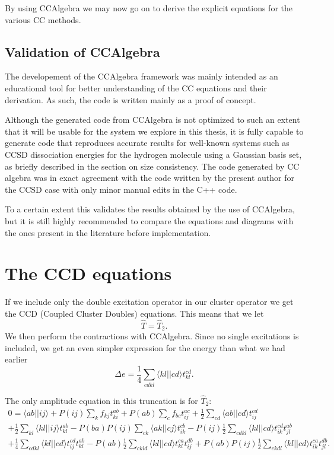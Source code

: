 By using CCAlgebra we may now go on to derive the explicit equations for the various CC methods. 

\subsection{Validation of CCAlgebra}

The developement of the CCAlgebra framework was mainly intended as an educational tool for better understanding of the CC equations and their derivation. As such, the code is written mainly as a proof of concept. 

Although the generated code from CCAlgebra is not optimized to such an
extent that it will be usable for the system we explore in this
thesis, it is fully capable to generate code that reproduces accurate
results for well-known systems such as CCSD dissociation energies for
the hydrogen molecule using a Gaussian basis set, as briefly described
in the section on size consistency. The code generated by CC algebra
was in exact agreement with the  code written by the present author for the CCSD case with
only minor manual edits in the C++ code.

To a certain extent this validates the results obtained by the use of
CCAlgebra, but it is still highly recommended to compare the equations
and diagrams with the ones present in the literature before
implementation.

\section{The CCD equations}

If we include only the double excitation operator in our cluster
operator we get the CCD (Coupled Cluster Doubles) equations. This
means that we let
\begin{equation}
\hat{T} = \hat{T}_2.
\end{equation}
We then perform the contractions with CCAlgebra. Since no single
excitations is included, we get an even simpler expression for the
energy than what we had earlier
\begin{equation}
\Delta e = \frac{1}{4} \sum_{cdkl} \langle kl || cd \rangle t_{kl}^{cd}.
\end{equation}

The only amplitude equation in this truncation is for $\hat{T}_2$:
\begin{multline}
0 =\langle ab \vert \vert ij \rangle + 
P(ij) \sum_{k} f_{kj} t_{ki}^{ab}+P(ab) \sum_{c} f_{bc} t_{ij}^{ac}+
\frac{1}{2} \sum_{cd} \langle ab \vert \vert cd \rangle t_{ij}^{cd} \\
+\frac{1}{2} \sum_{kl} \langle kl \vert \vert ij \rangle t_{kl}^{ab}-
P(ba)P(ij) \sum_{ck} \langle ak \vert \vert cj \rangle t_{ik}^{cb}- 
P(ij)\frac{1}{2} \sum_{cdkl} \langle kl \vert \vert cd \rangle t_{ik}^{cd} t_{jl}^{ab}\\
+\frac{1}{4} \sum_{cdkl} \langle kl \vert \vert cd \rangle t_{ij}^{cd} t_{kl}^{ab}-
 P(ab)\frac{1}{2} \sum_{ckld} \langle kl \vert \vert cd \rangle t_{kl}^{ca} t_{ij}^{db}+
P(ab)P(ij)\frac{1}{2} \sum_{ckdl} \langle kl \vert \vert cd \rangle t_{ik}^{ca} t_{jl}^{db}.
\end{multline}

